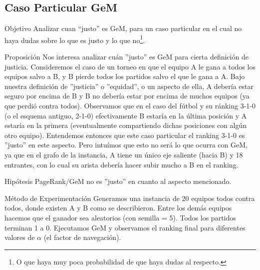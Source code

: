 \subsection{Caso Particular GeM}
\label{subsec:exp8}
\begin{LaTeXdescription}
    \item[Objetivo] Analizar cuan ``justo'' es GeM, para un caso particular en
        el cual no haya dudas sobre lo que es justo y lo que no\footnote{O que
        haya muy poca probabilidad de que haya dudas al respecto.}.\\

    \item[Proposici\'on] Nos interesa analizar cu\'an ''justo'' es GeM para
        cierta definici\'on de justicia. Consideremos el caso de un torneo en
        que el equipo A le gana a todos los equipos salvo a B, y B pierde todos
        los partidos salvo el que le gana a A. Bajo nuestra definición de
        ''justicia'' o ''equidad'', o un aspecto de ella, A deber\'ia estar
        seguro por encima de B y B no deber\'ia estar por encima de muchos
        equipos (ya que perdi\'o contra todos). Observamos que en el caso del
        f\'utbol y su ránking 3-1-0 (o el esquema antiguo, 2-1-0) efectivamente
        B estar\'ia en la \'ultima posici\'on y A estar\'ia en la primera
        (eventualmente compartiendo dichas posiciones con alg\'un otro equipo).
        Entendemos entonces que este caso particular el ranking 3-1-0 es
        ''justo'' en este aspecto. Pero intu\'imos que esto no ser\'a lo que
        ocurra con GeM, ya que en el grafo de la instancia, A tiene un \'unico
        eje saliente (hacia B) y 18 entrantes, con lo cual su arista deber\'ia
        hacer subir mucho a B en el ranking.\\

    \item[Hip\'otesis] PageRank/GeM no es ''justo'' en cuanto al aspecto
        mencionado.\\

    \item[M\'etodo de Experimentaci\'on] Generamos una instancia de 20 equipos
        todos contra todos, donde existen A y B como se describieron. Entre los
        dem\'as equipos hacemos que el ganador sea aleatorios (con semilla =
        5). Todos los partidos terminan 1 a 0. Ejecutamos GeM y observamos el
        ranking final para diferentes valores de $\alpha$ (el factor de
        navegaci\'on).


\end{LaTeXdescription}

